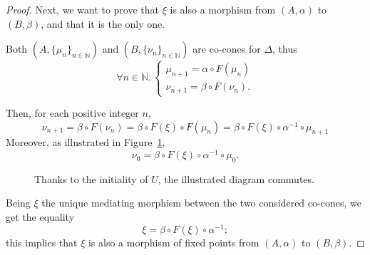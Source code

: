 \begin{proof}
  Next, we want to prove that \(\xi\) is also a morphism from \((A,\alpha)\) to \((B,\beta)\), and that it is the only one.
  
  Both \((A,\lbrace \mu_n \rbrace_{n \in \mathbb{N}})\) and \((B,\lbrace \nu_n \rbrace_{n \in \mathbb{N}})\) are co-cones for \(\Delta\), thus
  \begin{equation}
    \forall n \in \mathbb{N}.\,
    \begin{cases}
      \mu_{n+1} = \alpha \circ F(\mu_n) \\
      \nu_{n+1} = \beta \circ F(\nu_n).
    \end{cases}
  \end{equation}
  
  Then, for each positive integer \(n\),
  \begin{equation}
    \nu_{n+1} = \beta \circ F(\nu_n) = \beta \circ F(\xi) \circ F(\mu_n)
     = \beta \circ F(\xi) \circ \alpha^{-1} \circ \mu_{n+1}
  \end{equation}
  Moreover, as illustrated in Figure~\ref{02:diagram-3},
  \begin{equation}
    \nu_{0} = \beta \circ F(\xi) \circ \alpha^{-1} \circ \mu_{0}. 
  \end{equation}
  \begin{figure}[!ht]
    \begin{center}
    \end{center}
    \caption{Thanks to the initiality of \(U\), the illustrated diagram commutes.}
    \label{02:diagram-3}
  \end{figure}
  
  Being \(\xi\) the unique mediating morphism between the two considered co-cones, we get the equality
  \begin{equation}
    \label{eqn:asd}
    \xi = \beta \circ F(\xi) \circ \alpha^{-1};
  \end{equation}
  this implies that \(\xi\) is also a morphism of fixed points from \((A,\alpha)\) to \((B,\beta)\).
  

\end{proof}

